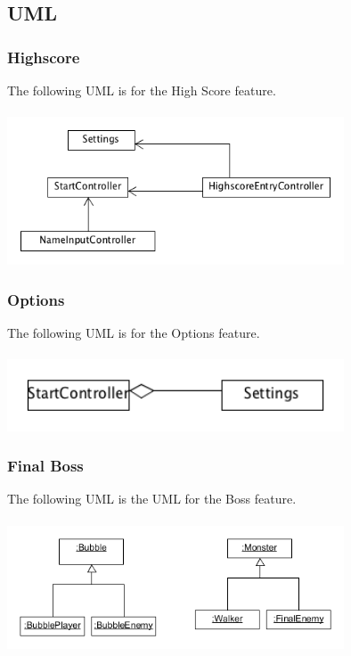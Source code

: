 \subsection{UML}

\subsubsection{Highscore}

The following UML is for the High Score feature.
\\\\
\includegraphics[width=100mm]{HighscoreUML.png}

\subsubsection{Options}
The following UML is for the Options feature.
\\\\
\includegraphics[width=100mm]{Options_UML.png}

\subsubsection{Final Boss}

The following UML is the UML for the Boss feature.
\\\\
\includegraphics[width=100mm]{FinalEnemyUml.png}



